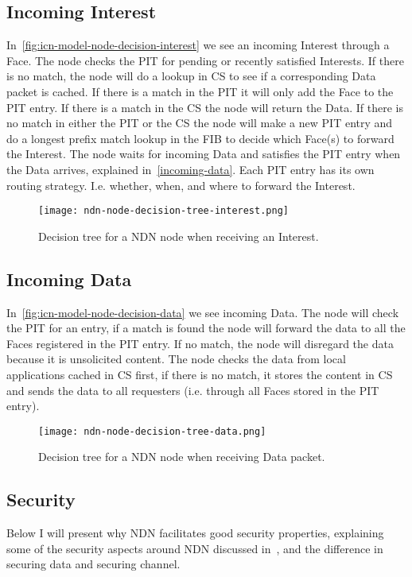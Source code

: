 \subsection{Incoming Interest}\label{incoming-interest}
In~\autoref{fig:icn-model-node-decision-interest} we see an incoming Interest through a Face. 
The node checks the \gls{PIT} for pending or recently satisfied Interests. 
If there is no match, the node will do a lookup in \gls{CS} to see if a corresponding Data packet is cached. 
If there is a match in the \gls{PIT} it will only add the Face to the \gls{PIT} entry. If there is a match in the \gls{CS} the node will return the Data. 
If there is no match in either the \gls{PIT} or the \gls{CS} the node will make a new \gls{PIT} entry and do a longest prefix match lookup in the \gls{FIB} to decide which Face(s) to forward the Interest.
The node waits for incoming Data and satisfies the \gls{PIT} entry when the Data arrives, explained in~\autoref{incoming-data}. 
Each \gls{PIT} entry has its own routing strategy. 
I.e. whether, when, and where to forward the Interest.
\begin{figure}[H]
  \centering
  \texttt{[image: ndn-node-decision-tree-interest.png]}
  \caption{Decision tree for a NDN node when receiving an Interest.}
  \label{fig:icn-model-node-decision-interest}
\end{figure}

\subsection{Incoming Data}\label{incoming-data}
In~\autoref{fig:icn-model-node-decision-data} we see incoming Data.
The node will check  the \gls{PIT} for an entry, if a match is found the node will forward the data to all the Faces registered in the \gls{PIT} entry.
If no match, the node will disregard the data because it is unsolicited content.
The node checks the data from local applications cached in \gls{CS} first, if there is no match, it stores the content in \gls{CS} and sends the data to all requesters (i.e. through all Faces stored in the \gls{PIT} entry).
\begin{figure}[H]
  \centering
  \texttt{[image: ndn-node-decision-tree-data.png]}
  \caption{Decision tree for a NDN node when receiving Data packet.}
  \label{fig:icn-model-node-decision-data}
\end{figure}


\subsection{Security}\label{ndn-security}
Below I will present why \gls{NDN} facilitates good security properties, explaining some of the security aspects around \gls{NDN} discussed in~\cite{secure-network-content}, and the difference in securing data and securing channel.

